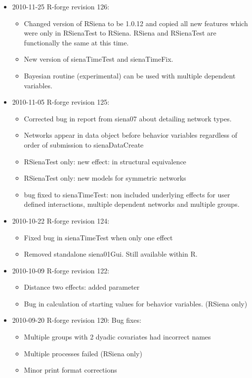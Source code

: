 \documentclass[a4paper,fleqn,11pt]{article}
\newcommand{\+}{\, + \,}
\newcommand{\Rn}{{\sf R}}
\begin{document}
{\begin{small}
\begin{itemize}
\item 2010-11-25 R-forge revision 126:
\begin{itemize}
\item Changed version of RSiena to be 1.0.12 and copied all new features which
  were only in RSienaTest to RSiena. RSiena and RSienaTest are
  functionally the same at this time.
\item New version of sienaTimeTest and sienaTimeFix.
\item Bayesian routine (experimental) can be used with multiple dependent
  variables.
\end{itemize}
\item 2010-11-05 R-forge revision 125:
\begin{itemize}
\item Corrected bug in report from siena07 about detailing network types.
\item Networks appear in data object before behavior variables regardless of
order of submission to sienaDataCreate
\item RSienaTest only: new effect: in structural equivalence
\item RSienaTest only: new models for symmetric networks
\item bug fixed to sienaTimeTest: non included underlying effects for user
  defined interactions, multiple dependent networks and multiple groups.
\end{itemize}
\item 2010-10-22 R-forge revision 124:
\begin{itemize}
\item Fixed bug in sienaTimeTest when only one effect
\item Removed standalone siena01Gui. Still available within \Rn.
\end{itemize}
\item 2010-10-09 R-forge revision 122:
\begin{itemize}
\item Distance two effects: added parameter
\item Bug in calculation of starting values for behavior variables.
(RSiena only)
\end{itemize}
\item 2010-09-20 R-forge revision 120: Bug fixes:
\begin{itemize}
\item Multiple groups with 2 dyadic covariates had incorrect names
\item Multiple processes failed (RSiena only)
\item Minor print format corrections

\end{itemize}
\end{itemize}
\end{small}}
\end{document}
